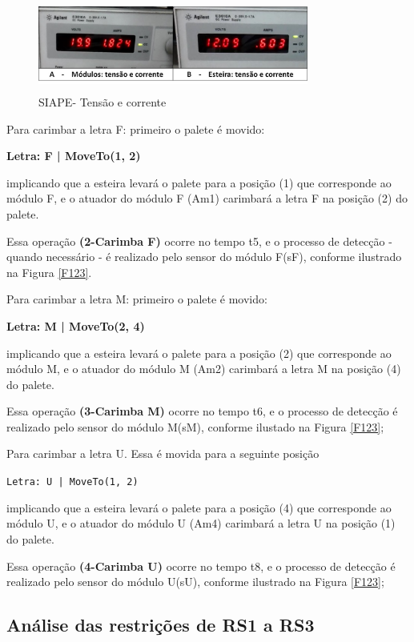 \documentclass[10pt,letterpaper,twocolumn]{IEEEtran}
\begin{document}
					\begin{figure}[!h]
						\centering
						\includegraphics[width=8.9cm, height=3cm]{MeDSE_imagens/F126_SIAPE_TENSAO_CORRENTE.jpg} 
						\caption{SIAPE- Tensão e corrente}
						\label{F126}
					\end{figure}



Para carimbar a letra F:  primeiro o palete é movido:
\begin{center}
	\textbf{Letra: F | MoveTo(1, 2)}
\end{center}
implicando que a esteira levará o palete para a posição (1) que corresponde ao módulo F, e o atuador do módulo F (Am1) carimbará a letra F na posição (2) do palete. 

Essa operação \textbf{(2-Carimba F)} ocorre no tempo t5, e o processo de detecção - quando necessário - é realizado pelo sensor do módulo F(sF), conforme ilustrado na Figura \ref{F123}.


Para carimbar a letra M: primeiro o palete é movido:
\begin{center}
	\textbf{Letra: M | MoveTo(2, 4)}
\end{center}
implicando que a esteira levará o palete para a posição (2) que corresponde ao módulo M, e o atuador do módulo M (Am2) carimbará a letra M na posição (4) do palete. 

Essa operação \textbf{(3-Carimba M)} ocorre no tempo t6, e o processo de detecção é realizado pelo sensor do módulo M(sM), conforme ilustado na Figura \ref{F123}; 

Para carimbar a letra U. Essa é movida para a seguinte posição
\begin{center}
	\texttt{Letra: U | MoveTo(1, 2)}
\end{center}
implicando que a esteira levará o palete para a posição (4) que corresponde ao módulo U, e o atuador do módulo U (Am4) carimbará a letra U na posição (1) do palete. 

Essa operação \textbf{(4-Carimba U)} ocorre no tempo t8, e o processo de detecção é realizado pelo sensor do módulo U(sU), conforme ilustrado na Figura \ref{F123};


\subsection{Análise das restrições de RS1 a RS3}	
\end{document}
